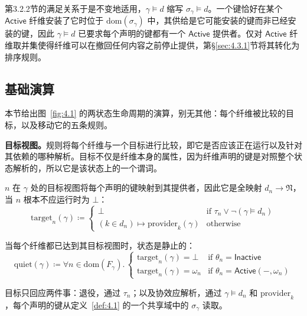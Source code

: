 第3.2.2节的满足关系于是不变地适用，$\gamma \models d$ 缩写 $\sigma_\gamma \models d$。一个键恰好在某个 $\mathsf{Active}$ 纤维安装了它时位于 $\mathrm{dom}(\sigma_\gamma)$ 中，其供给是它可能安装的键而非已经安装的键，因此 $\gamma \models d$ 已要求每个声明的键都有一个 $\mathsf{Active}$ 提供者。仅对 $\mathsf{Active}$ 纤维取并集使得纤维可以在撤回任何内容之前停止提供，第\S\ref{sec:4.3.1}节将其转化为排序规则。

\subsection{基础演算}\label{sec:4.2}

本节给出图~\ref{fig:4.1} 的两状态生命周期的演算，别无其他：每个纤维被比较的目标，以及移动它的五条规则。

\textbf{目标视图。}规则将每个纤维与一个目标进行比较，即它是否应该正在运行以及针对其依赖的哪种解析。目标不仅是纤维本身的属性，因为纤维声明的键是对照整个状态解析的，所以它是该状态上的一个谓词。

\begin{definition}\label{def:4.4}
$n$ 在 $\gamma$ 处的目标视图将每个声明的键映射到其提供者，因此它是全映射 $d_n \to \mathfrak{N}$，当 $n$ 根本不应运行时为 $\bot$：
\begin{equation}\label{eq:4.5}
\mathrm{target}_n(\gamma) \coloneqq \begin{cases}
\bot & \text{if } \tau_n \lor \lnot(\gamma \models d_n) \\
(k \in d_n) \mapsto \mathrm{provider}_k(\gamma) & \text{otherwise}
\end{cases}
\end{equation}
\end{definition}

当每个纤维都已达到其目标视图时，状态是静止的：
\begin{equation}\label{eq:4.6}
\mathrm{quiet}(\gamma) \coloneqq \forall n \in \mathrm{dom}(F_\gamma).\, \begin{cases}
\mathrm{target}_n(\gamma) = \bot & \text{if } \theta_n = \mathsf{Inactive} \\
\mathrm{target}_n(\gamma) = \omega_n & \text{if } \theta_n = \mathsf{Active}(-, \omega_n)
\end{cases}
\end{equation}

目标只回应两件事：退役，通过 $\tau_n$；以及协效应解析，通过 $\gamma \models d_n$ 和 $\mathrm{provider}_k$，每个声明的键从定义~\ref{def:4.1} 的一个共享域中的 $\sigma_\gamma$ 读取。

